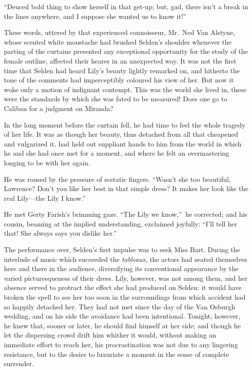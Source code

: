 \documentclass[12pt,a4paper]{book}
\begin{document}
``Deuced bold thing to show herself in that get-up; but, gad,
there isn't a break in the lines anywhere, and I suppose she
wanted us to know it!''





These words, uttered by that experienced connoisseur, Mr.\ Ned Van
Alstyne, whose scented white moustache had brushed Selden's
shoulder whenever the parting of the curtains presented any
exceptional opportunity for the study of the female outline,
affected their hearer in an unexpected way. It was not the first
time that Selden had heard Lily's beauty lightly remarked on, and
hitherto the tone of the comments had imperceptibly coloured his
view of her. But now it woke only a motion of indignant contempt. 
This was the world she lived in, these were the standards by
which she was fated to be measured! Does one go to Caliban for a
judgment on Miranda?





In the long moment before the curtain fell, he had time to feel
the whole tragedy of her life. It was as though her beauty, thus
detached from all that cheapened and vulgarized it, had held out
suppliant hands to him from the world in which he and she had
once met for a moment, and where he felt an overmastering longing
to be with her again.





He was roused by the pressure of ecstatic fingers. ``Wasn't she
too beautiful, Lawrence? Don't you like her best in that simple
dress? It makes her look like the real Lily---the Lily I know.''





He met Gerty Farish's brimming gaze. ``The Lily we know,''\ he
corrected; and his cousin, beaming at the implied understanding,
exclaimed joyfully: ``I'll tell her that! She always says you
dislike her.''





The performance over, Selden's first impulse was to seek Miss
Bart. During the interlude of music which succeeded the \textit{tableaux},
the actors had seated themselves here and there in the audience,
diversifying its conventional appearance by the varied
picturesqueness of their dress. Lily, however, was not among
them, and her absence served to protract the effect she had
produced on Selden: it would have broken the spell to see her too
soon in the surroundings from which accident had so happily
detached her. They had not met since the day of the Van Osburgh
wedding, and on his side the avoidance had been intentional. 
Tonight, however, he knew that, sooner or later, he should find
himself at her side; and though he let the dispersing crowd drift
him whither it would, without making an immediate effort to reach
her, his procrastination was not due to any lingering resistance,
but to the desire to luxuriate a moment in the sense of complete
surrender.
\end{document}
